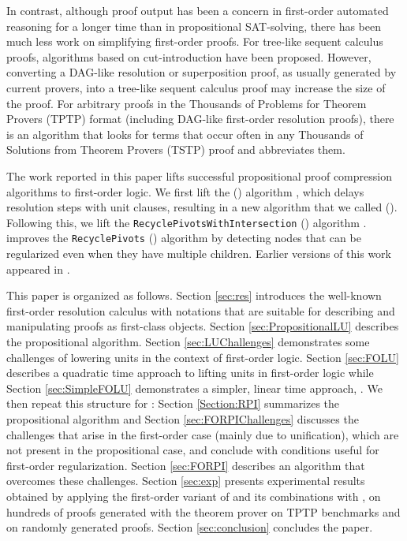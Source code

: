 In contrast, although proof output has been a concern in first-order automated reasoning for a longer time than in propositional SAT-solving, there has been much less work on simplifying first-order proofs. For tree-like sequent calculus proofs, algorithms based on cut-introduction \cite{BrunoLPAR,Hetzl} have been proposed. However, converting a DAG-like resolution or superposition proof, as usually generated by current provers, into a tree-like sequent calculus proof may increase the size of the proof. For arbitrary proofs in the Thousands of Problems for Theorem Provers (TPTP) \cite{TPTP} format (including DAG-like first-order resolution proofs), there is an algorithm \cite{LPARCzech} that looks for terms that occur often in any Thousands of Solutions from Theorem Provers (TSTP) \cite{TPTP} proof and abbreviates them. 

The work reported in this paper lifts successful propositional proof compression algorithms to first-order logic.
We first lift the {\LowerUnits} ({\LU}) algorithm \cite{LURPI}, which delays resolution steps with unit clauses, resulting in a new algorithm that we called {\SFOLowerUnits} ({\GFOLU}). 
Following this, we lift the \texttt{Recycle\-PivotsWithIntersection} ({\RPI}) algorithm \cite{LURPI}. 
\RPI improves the \texttt{RecyclePivots} ({\RP}) algorithm \cite{RP08} by detecting nodes that can be regularized even when they have multiple children.
Earlier versions of this work appeared in \cite{GFOLU,forpigcai}.

This paper is organized as follows. 
Section \ref{sec:res} introduces the well-known first-order resolution calculus with notations that are suitable for describing and manipulating proofs as first-class objects.
Section \ref{sec:PropositionalLU} describes the propositional \LowerUnits algorithm.
Section \ref{sec:LUChallenges} demonstrates some challenges of lowering units in the context of first-order logic.
Section \ref{sec:FOLU} describes a quadratic time approach to lifting units in first-order logic while Section \ref{sec:SimpleFOLU} demonstrates a simpler, linear time approach, \GFOLU.
We then repeat this structure for {\RPI}: Section \ref{Section:RPI} summarizes the propositional {\RPI} algorithm and Section \ref{sec:FORPIChallenges} discusses the challenges that arise in the first-order case (mainly due to unification), which are not present in the propositional case, and conclude with conditions useful for first-order regularization. 
Section \ref{sec:FORPI} describes an algorithm that overcomes these challenges. 
Section \ref{sec:exp} presents experimental results obtained by applying the first-order variant of \RPI and its combinations with {\GFOLU}, on hundreds of proofs generated with the {\SPASS} theorem prover on TPTP benchmarks \cite{TPTP} and on randomly generated proofs. 
Section \ref{sec:conclusion} concludes the paper.

